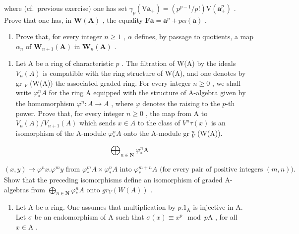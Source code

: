 where (cf.~previous exercise) one has set \(\gamma_{p}(\mathrm{V}\boldsymbol{a}_{+}) = (p^{p-1}/p!)\mathrm{V}(\boldsymbol{a}_{+}^{p})\) . Prove that one has, in \(\mathbf{W}(\mathbf{A})\) , the equality \(\mathbf{F}\boldsymbol{a} = \boldsymbol{a}^{p} + p\alpha(\boldsymbol{a})\) .

\begin{enumerate}
\def\labelenumi{\alph{enumi})}
\setcounter{enumi}{2}
\tightlist
\item
  Prove that, for every integer \(n \geqslant 1\) , \(\alpha\) defines, by passage to quotients, a map \(\alpha_{n}\) of \(\mathbf{W}_{n+1}(\mathbf{A})\) in \(\mathbf{W}_{n}(\mathbf{A})\) .
\end{enumerate}

\begin{enumerate}
\def\labelenumi{\arabic{enumi})}
\setcounter{enumi}{12}
\tightlist
\item
  Let A be a ring of characteristic \(p\) . The filtration of W(A) by the ideals \(V_n(A)\) is compatible with the ring structure of W(A), and one denotes by gr \(_{V}\) (W(A)) the associated graded ring. For every integer \(n \geqslant 0\) , we shall write \(\varphi_*^n A\) for the ring A equipped with the structure of A-algebra given by the homomorphism \(\varphi^n: A \to A\) , where \(\varphi\) denotes the raising to the \(p\)-th power. Prove that, for every integer \(n \geqslant 0\) , the map from A to \(V_n(A)/V_{n+1}(A)\) which sends \(x \in A\) to the class of \(V^n\tau(x)\) is an isomorphism of the A-module \(\varphi_*^n A\) onto the A-module gr \(_{V}^n\) (W(A)).
\end{enumerate}

\[
\bigoplus_ {n \in \mathbf {N}} \varphi_ {*} ^ {n} \mathrm{A}
\]

\((x, y) \mapsto \varphi^{n} x. \varphi^{m} y \text{ from } \varphi_{*}^{m} A \times \varphi_{*}^{n} A \text{ into } \varphi_{*}^{m+n} A \text{ (for every pair of positive integers } (m, n)).\) Show that the preceding isomorphisms define an isomorphism of graded A-algebras from \(\bigoplus_{n\in \mathbf{N}}\varphi_{*}^{n} A \text{ onto } gr_{V}(W(A))\) .

\begin{enumerate}
\def\labelenumi{\arabic{enumi})}
\setcounter{enumi}{13}
\tightlist
\item
  Let A be a ring. One assumes that multiplication by \(p.1_{\mathrm{A}}\) is injective in A. Let \(\sigma\) be an endomorphism of A such that \(\sigma(x) \equiv x^p \mod p\mathrm{A}\) , for all \(x \in \mathrm{A}\) .
\end{enumerate}

